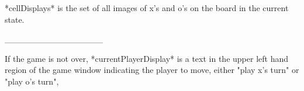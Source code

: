 \documentclass{led_doc}
\begin{document}
\begin{ledDef}
\end{ledDef}

\begin{ledDef}
\end{ledDef}

\begin{ledDef}
\end{ledDef}

\begin{ledCmnt}
*cellDisplays* is the set of all images of x's and o's on the board in the current state.
\end{ledCmnt}

\begin{ledDef}
\end{ledDef}

\begin{ledDef}
\end{ledDef}

\begin{ledCmnt}
________________

If the game is not over, *currentPlayerDisplay* is a text in the upper left hand region of the game window indicating the player to move, either "play x's turn" or "play o's turn",
\end{ledCmnt}

\begin{ledDef}
\end{ledDef}
\end{document}
